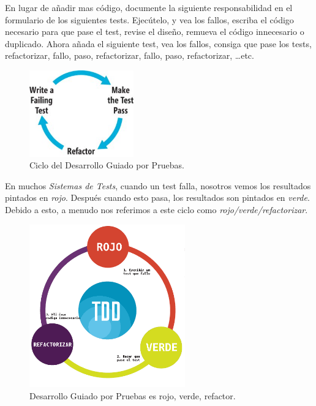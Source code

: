 En lugar de añadir mas código, documente la siguiente responsabilidad en el
formulario de los siguientes tests. Ejecútelo, y vea los fallos, escriba el código
necesario para que pase el test, revise el diseño, remueva el código innecesario
o duplicado. Ahora añada el siguiente test, vea los fallos, consiga que pase los
tests, refactorizar, fallo, paso, refactorizar, fallo, paso, refactorizar,
\ldots etc.

\begin{figure}[h]
  \begin{center}
  \includegraphics[width=0.4\textwidth]{figures/chapter2/tdd_cycle.jpg}
  \caption[TDD]{Ciclo del Desarrollo Guiado por Pruebas.}
\end{center}
\end{figure}
En muchos {\it Sistemas de Tests}, cuando un test falla, nosotros vemos los
resultados pintados en {\it rojo}. Después cuando esto pasa, los resultados
son pintados en {\it verde}. Debido a esto, a menudo nos referimos a este ciclo
como {\it rojo/verde/refactorizar}.

\begin{figure}[h]
  \centering
  \includegraphics[width=0.6\textwidth]{figures/chapter2/tdd.png}
  \caption[TDD: red, green, refactor]{Desarrollo Guiado por Pruebas es rojo, verde, refactor.}
\end{figure}

